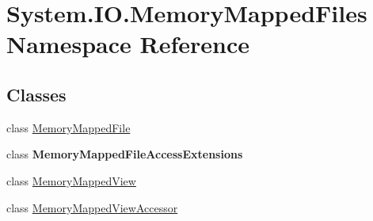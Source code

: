 \hypertarget{namespace_system_1_1_i_o_1_1_memory_mapped_files}{}\section{System.\+I\+O.\+Memory\+Mapped\+Files Namespace Reference}
\label{namespace_system_1_1_i_o_1_1_memory_mapped_files}
\subsection*{Classes}
\begin{DoxyCompactItemize}
\item 
class \hyperlink{class_system_1_1_i_o_1_1_memory_mapped_files_1_1_memory_mapped_file}{Memory\+Mapped\+File}
\item 
class {\bfseries Memory\+Mapped\+File\+Access\+Extensions}
\item 
class \hyperlink{class_system_1_1_i_o_1_1_memory_mapped_files_1_1_memory_mapped_view}{Memory\+Mapped\+View}
\item 
class \hyperlink{class_system_1_1_i_o_1_1_memory_mapped_files_1_1_memory_mapped_view_accessor}{Memory\+Mapped\+View\+Accessor}
\end{DoxyCompactItemize}
